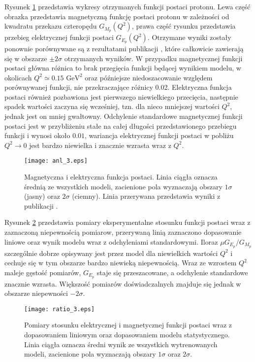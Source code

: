 \documentclass[11pt]{book}
\theoremstyle{definition}
\begin{document}
Rysunek \ref{fig:ff3} przedstawia wykresy otrzymanych funkcji postaci protonu. Lewa część obrazka przedstawia magnetyczną funkcję postaci protonu w zależności od kwadratu przekazu czteropędu $G_{M_p}\left(Q^2\right)$, prawa część rysunku przedstawia przebieg elektrycznej funkcji postaci $G_{E_p}\left(Q^2\right)$. Otrzymane wyniki zostały ponownie porównywane są z rezultatami publikacji \cite{2009PhRvC..79f5204A}, które całkowicie zawierają się w obszarze $\pm 2\sigma$ otrzymanych wyników. W przypadku magnetycznej funkcji postaci główna różnica to brak przegięcia funkcji będącej wynikiem modelu, w okolicach $Q^2 \simeq 0.15 \text{ GeV}^2$ oraz późniejsze niedoszacowanie względem porównywanej funkcji, nie przekraczające różnicy 0.02. Elektryczna funkcja postaci również pozbawiona jest pierwszego niewielkiego przecięcia, następnie spadek wartości zaczyna się wcześniej, tzn. dla nieco mniejszej wartości $Q^2$, jednak jest on mniej gwałtowny. Odchylenie standardowe magnetycznej funkcji postaci jest w przybliżeniu stałe na całej długości przedstawionego przebiegu funkcji i wynosi około $0.01$, wariancja elektrycznej funkcji postaci w pobliżu $Q^2 \rightarrow 0$ jest bardzo niewielka i znacznie wzrasta wraz z $Q^2$.
% 
\begin{figure}[hp!]
	\centering
	\texttt{[image: anl\_3.eps]}
	\caption{Magnetyczna i elektryczna funkcja postaci. Linia ciągła oznacza średnią ze wszystkich modeli, zacienione pola wyznaczają obszary $1 \sigma$ (jasny) oraz $2\sigma$ (ciemny). Linia przerywana przedstawia wyniki z publikacji \cite{2009PhRvC..79f5204A}. } 
	\label{fig:ff3}
\end{figure}

Rysunek \ref{fig:ratio3} przedstawia pomiary eksperymentalne stosunku funkcji postaci wraz z zaznaczoną niepewnością pomiarow, przerywaną linią zaznaczono dopasowanie liniowe oraz wynik modelu wraz z odchyleniami standardowymi. Iloraz $\mu G_{E_p} / G_{M_p}$ szczególnie dobrze opisywany jest przez model dla niewielkich wartości $Q^2$ i cechuje się w tym obszarze bardzo niewieką niepewnością. Wraz ze wzrostem $Q^2$ maleje gęstość pomiarów, $G_{E_p}$ staje się przeszacowane, a odchylenie standardowe znacznie wzrasta. Większość pomiarów doświadczalnych znajduje się jednak w obszarze niepewności $-2\sigma$.

\begin{figure}[hp!]
	\centering
	\texttt{[image: ratio\_3.eps]}
	\caption{Pomiary stosunku elektrycznej i magnetycznej funkcji postaci wraz z dopasowaniem liniowym oraz dopasowaniem modelu statystycznego. Linia ciągła oznacza średni wynik ze wszystkich wytrenowanych modeli, zacienione pola wyznaczają obszary $1 \sigma$ oraz $2\sigma$.} 
	\label{fig:ratio3}
\end{figure}
\end{document}
